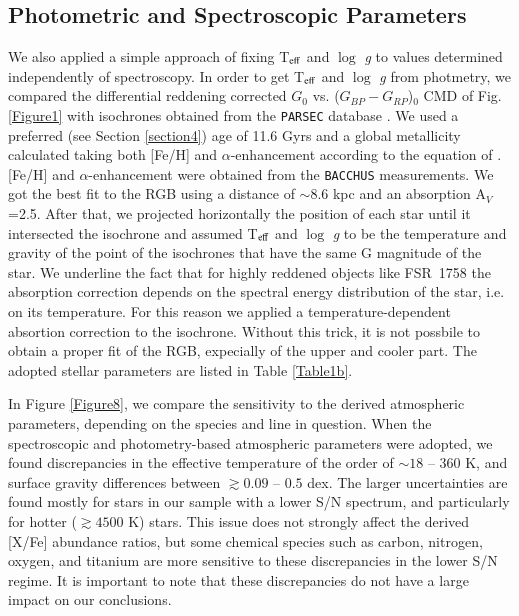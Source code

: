 \documentclass[longauth]{aa} %
\begin{document}
\subsection{Photometric and Spectroscopic Parameters}

We also applied a simple approach of fixing T$_{\rm eff}$ and $\log$ \textit{g} to values determined independently of spectroscopy. In order to get T$_{\rm eff}$ and $\log$ \textit{g} from photmetry, we compared the differential reddening corrected  $G_{0}$ vs. ($G_{BP}-G_{RP}$)$_{0}$ CMD of Fig. \ref{Figure1} with isochrones obtained from the \texttt{PARSEC} database \citep{Bressan2012}. We used a preferred (see Section \ref{section4}) age of 11.6 Gyrs and a global metallicity calculated taking both [Fe/H] and $\alpha$-enhancement according to the equation of \citet{Salaris1993}. [Fe/H] and $\alpha$-enhancement were obtained from the \texttt{BACCHUS} measurements. We got the best fit to the RGB using a distance of $\sim$8.6 kpc and an absorption A$_V$=2.5. After that, we projected horizontally the position of each star until it intersected the isochrone and assumed T$_{\rm eff}$ and $\log$ \textit{g} to be the temperature and gravity of the point of the isochrones that have the same G magnitude of the star. We underline the fact that for highly reddened objects like FSR~1758 the absorption correction depends on the spectral energy distribution of  the star, i.e. on its temperature. For this reason we applied a temperature-dependent absortion correction to the isochrone. Without this trick, it is not possbile to obtain a proper fit of the RGB, expecially of the upper and cooler part. The adopted stellar parameters are listed in Table \ref{Table1b}. 

In Figure \ref{Figure8}, we compare the sensitivity to the derived atmospheric parameters, depending on the species and line in question. When the spectroscopic and photometry-based atmospheric parameters were adopted, we found discrepancies in the effective temperature of the order of $\sim18$ -- $360$ K, and surface gravity differences between $\gtrsim 0.09$ -- $0.5$ dex. The larger uncertainties are found mostly for stars in our sample with a lower S/N spectrum, and particularly for hotter ($\gtrsim4500$ K) stars. This issue does not strongly affect the derived [X/Fe] abundance ratios, but some chemical species such as carbon, nitrogen, oxygen, and titanium are more sensitive to these discrepancies in the lower S/N regime. 
It is important to note that these discrepancies do not have a large impact on our conclusions.
 
\end{document}
